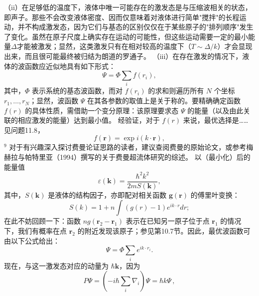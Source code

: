 （ii）在足够低的温度下，液体中唯一可能存在的激发态是与压缩波相关的状态，即声子。那些不会改变液体密度、因而仅意味着对液体进行简单"搅拌"的长程运动，并不构成激发态，因为它们与基态的区别仅仅在于某些原子的"排列顺序"发生了变化。虽然在原子尺度上确实存在运动的可能性，但这些运动需要一定的最小能量\(\Delta\)才能被激发；显然，这类激发只有在相对较高的温度下（\(T \sim \Delta/k\)）才会显现出来，而且很可能最终被归结为朗道的罗通子。
（iii）在存在激发的情况下，液体的波函数应近似地具有如下形式：
\begin{equation}\tag{11.4.3}\label{eq:11.4.3}
\Psi = \Phi \sum _ { i } f ( r _ { i } ) ,
\end{equation}
其中，\(\Phi\) 表示系统的基态波函数，而对 \(f(r_{i})\) 的求和则遍历所有 \(N\) 个坐标 \(r_{1},\ldots,r_{N}\)；显然，波函数 \(\Psi\) 在其各参数的取值上是关于称的。要精确确定函数 \(f(r)\) 的具体性质，需借助一个变分原理：该原理要求态 \(\Psi\) 的能量（以及由此关联的相应激发的能量）达到最小值。
经验证，对于 \(f(r)\) 来说，最优选择是\ldots\ldots 见问题11.8，
\begin{equation}\tag{11.4.4}\label{eq:11.4.4}
f ( \boldsymbol { r } ) = \exp i ( k \cdot \boldsymbol { r } ) ,
\end{equation}
\(^{9}\) 对于有兴趣深入探讨费曼论证思路的读者，建议查阅费曼的原始论文，或参考梅赫拉与帕特里亚（1994）撰写的关于费曼超流体研究的综述。
以（最小化）后的能量值
\begin{equation}\tag{11.4.5}\label{eq:11.4.5}
\varepsilon ( \pmb { k } ) = \frac { \hbar ^{2} k ^{2} } { 2 m S ( \pmb { k } ) } ,
\end{equation}
其中，\(S(\boldsymbol{k})\) 是液体的结构因子，亦即配对相关函数 \(\mathbf{g}(\boldsymbol{r})\) 的傅里叶变换：
\begin{equation}\tag{11.4.6}\label{eq:11.4.6}
S ( k ) = 1 + n \int ( g ( r ) - 1 ) e ^{i k \cdot r} d r ;
\end{equation}
在此不妨回顾一下：函数 \(ng(\boldsymbol{r}_{2}-\boldsymbol{r}_{1})\) 表示在已知另一原子位于点 \(\boldsymbol{r}_{1}\) 的情况下，我们有概率在点 \(\boldsymbol{r}_{2}\) 的附近发现该原子；参见第10.7节。因此，最优波函数可由以下公式给出：
\begin{equation}\tag{11.4.7}\label{eq:11.4.7}
\Psi = \Phi \sum _ { i } e ^{i k \cdot r _ { i} } .
\end{equation}
现在，与这一激发态对应的动量为 \(\hbar\mathbf{k}\)，因为
\begin{equation}\tag{11.4.8}\label{eq:11.4.8}
P \Psi = \left( - i \hbar \sum _ { i } \nabla _ { i } \right) \Psi = \hbar k \Psi \, ,
\end{equation}
